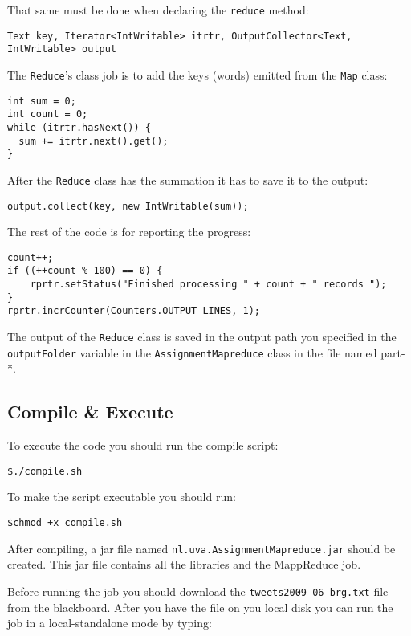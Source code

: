 \documentclass[a4paper,10pt]{article}
\begin{document}
That same must be done when declaring the \texttt{reduce} method:
\begin{lstlisting}
Text key, Iterator<IntWritable> itrtr, OutputCollector<Text, IntWritable> output
\end{lstlisting}


The \texttt{Reduce}'s class job is to add the keys (words) emitted from the \texttt{Map} class: 
\begin{lstlisting}
int sum = 0;
int count = 0;
while (itrtr.hasNext()) {
  sum += itrtr.next().get();
}
\end{lstlisting}


After the \texttt{Reduce} class has the summation it has to save it to the output: 

\begin{lstlisting}
output.collect(key, new IntWritable(sum));
\end{lstlisting}


The rest of the code is for reporting the progress:

\begin{lstlisting}
count++;
if ((++count % 100) == 0) {
    rprtr.setStatus("Finished processing " + count + " records ");
}
rprtr.incrCounter(Counters.OUTPUT_LINES, 1);
\end{lstlisting}

The output of the \texttt{Reduce} class is saved in the output path you specified in the \texttt{outputFolder} variable in the \texttt{AssignmentMapreduce} class in the file named part-*. 

\subsection{Compile \& Execute}

To execute the code you should run the compile script:
\lstset{language=}
\begin{lstlisting}
$./compile.sh 
\end{lstlisting}

To make the script executable you should run:
\begin{lstlisting}
$chmod +x compile.sh
\end{lstlisting}

After compiling, a jar file named \texttt{nl.uva.AssignmentMapreduce.jar} should be created. This jar file contains all the libraries and the MappReduce job. 

Before running the job you should download the \texttt{tweets2009-06-brg.txt} file from the blackboard. 
After you have the file on you local disk you can run the job in a local-standalone mode by typing:
\end{document}
